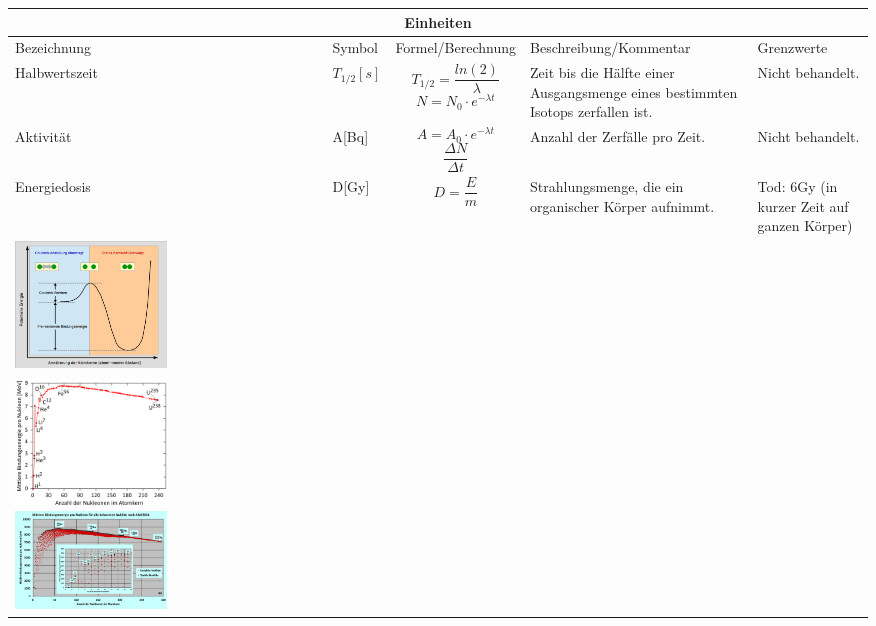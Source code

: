 \documentclass{article}
\begin{document}
	    		\begin{tabular}{ |p{4cm}|p{1cm}|p{3cm}|p{4cm}|p{4cm}|  }
	    			\hline
	    			\multicolumn{5}{|c|}{\textbf{Einheiten}} \\
	    			\hline
	    			Bezeichnung & Symbol & Formel/Berechnung & Beschreibung/Kommentar & Grenzwerte \\
	    			\hline
	    			Halbwertszeit   & $ T_{1/2} [s] $   & \[ T_{1/2}=\frac{ln(2)}{\lambda} \] \[N=N_0 \cdot e^{-\lambda t}\] &   Zeit bis die Hälfte einer Ausgangsmenge eines bestimmten Isotops zerfallen ist. & Nicht behandelt. \\
	    			\hline
	    			Aktivität & A[Bq] &   \[A=A_0 \cdot e^{-\lambda t}\] \[\frac{\Delta N}{\Delta t}\]  & Anzahl der Zerfälle pro Zeit.   & Nicht behandelt. \\
	    			\hline
	    			Energiedosis & D[Gy] & \[D=\frac{E}{m}\] &  Strahlungsmenge, die ein organischer Körper aufnimmt. & Tod: 6Gy (in kurzer Zeit auf ganzen Körper)\\
	    			\hline
	    			\includegraphics[width=0.5\textwidth]{graphics/potentielleKernenergie.jpg} \\
	    			\includegraphics[width=0.5\textwidth]{graphics/bindungsEnergie.png}
	    			\includegraphics[width=0.5\textwidth]{graphics/bindungsEnergie_big.png} \\

\end{tabular}
\end{document}
